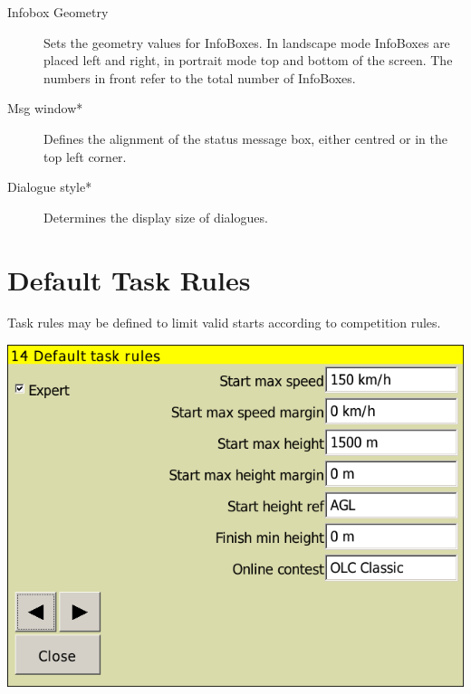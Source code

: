 \begin{description}
\item[Infobox Geometry]  Sets the geometry values for InfoBoxes. In landscape
mode InfoBoxes are placed left and right, in portrait mode top and bottom of the screen. The numbers in front refer 
to the total number of InfoBoxes.
\item[Msg window*]  Defines the alignment of the status message box, either
centred or in the top left corner.
\item[Dialogue style*]  Determines the display size of dialogues.
\end{description}


\clearpage
\section{Default Task Rules}
Task rules may be defined to limit valid starts according to competition
rules. \label{conf:taskrules}

\begin{center}
\includegraphics[angle=0,width=0.8\linewidth,keepaspectratio='true']{figures/config-rules.png}
\end{center}

